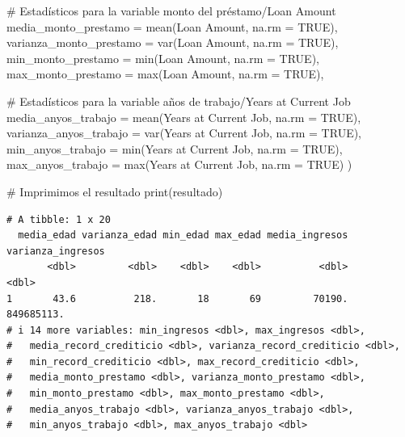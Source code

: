\documentclass[
  letterpaper,
  DIV=11,
  numbers=noendperiod]{scrreprt}
\newenvironment{Shaded}{\begin{snugshade}}{\end{snugshade}}
\newcommand{\AttributeTok}[1]{\textcolor[rgb]{0.40,0.45,0.13}{#1}}
\newcommand{\CommentTok}[1]{\textcolor[rgb]{0.37,0.37,0.37}{#1}}
\newcommand{\ConstantTok}[1]{\textcolor[rgb]{0.56,0.35,0.01}{#1}}
\newcommand{\FunctionTok}[1]{\textcolor[rgb]{0.28,0.35,0.67}{#1}}
\newcommand{\NormalTok}[1]{\textcolor[rgb]{0.00,0.23,0.31}{#1}}
\newcommand{\StringTok}[1]{\textcolor[rgb]{0.13,0.47,0.30}{#1}}
\begin{document}
\begin{Shaded}
\begin{Highlighting}[]
    \CommentTok{\# Estadísticos para la variable monto del préstamo/Loan Amount}
    \AttributeTok{media\_monto\_prestamo =} \FunctionTok{mean}\NormalTok{(}\StringTok{\textasciigrave{}}\AttributeTok{Loan Amount}\StringTok{\textasciigrave{}}\NormalTok{, }\AttributeTok{na.rm =} \ConstantTok{TRUE}\NormalTok{),}
    \AttributeTok{varianza\_monto\_prestamo =} \FunctionTok{var}\NormalTok{(}\StringTok{\textasciigrave{}}\AttributeTok{Loan Amount}\StringTok{\textasciigrave{}}\NormalTok{, }\AttributeTok{na.rm =} \ConstantTok{TRUE}\NormalTok{),}
    \AttributeTok{min\_monto\_prestamo =} \FunctionTok{min}\NormalTok{(}\StringTok{\textasciigrave{}}\AttributeTok{Loan Amount}\StringTok{\textasciigrave{}}\NormalTok{, }\AttributeTok{na.rm =} \ConstantTok{TRUE}\NormalTok{),}
    \AttributeTok{max\_monto\_prestamo =} \FunctionTok{max}\NormalTok{(}\StringTok{\textasciigrave{}}\AttributeTok{Loan Amount}\StringTok{\textasciigrave{}}\NormalTok{, }\AttributeTok{na.rm =} \ConstantTok{TRUE}\NormalTok{),}
    
    \CommentTok{\# Estadísticos para la variable años de trabajo/Years at Current Job}
    \AttributeTok{media\_anyos\_trabajo =} \FunctionTok{mean}\NormalTok{(}\StringTok{\textasciigrave{}}\AttributeTok{Years at Current Job}\StringTok{\textasciigrave{}}\NormalTok{, }\AttributeTok{na.rm =} \ConstantTok{TRUE}\NormalTok{),}
    \AttributeTok{varianza\_anyos\_trabajo =} \FunctionTok{var}\NormalTok{(}\StringTok{\textasciigrave{}}\AttributeTok{Years at Current Job}\StringTok{\textasciigrave{}}\NormalTok{, }\AttributeTok{na.rm =} \ConstantTok{TRUE}\NormalTok{),}
    \AttributeTok{min\_anyos\_trabajo =} \FunctionTok{min}\NormalTok{(}\StringTok{\textasciigrave{}}\AttributeTok{Years at Current Job}\StringTok{\textasciigrave{}}\NormalTok{, }\AttributeTok{na.rm =} \ConstantTok{TRUE}\NormalTok{),}
    \AttributeTok{max\_anyos\_trabajo =} \FunctionTok{max}\NormalTok{(}\StringTok{\textasciigrave{}}\AttributeTok{Years at Current Job}\StringTok{\textasciigrave{}}\NormalTok{, }\AttributeTok{na.rm =} \ConstantTok{TRUE}\NormalTok{)}
\NormalTok{  )}

\CommentTok{\# Imprimimos el resultado}
\FunctionTok{print}\NormalTok{(resultado)}
\end{Highlighting}
\end{Shaded}

\begin{verbatim}
# A tibble: 1 x 20
  media_edad varianza_edad min_edad max_edad media_ingresos varianza_ingresos
       <dbl>         <dbl>    <dbl>    <dbl>          <dbl>             <dbl>
1       43.6          218.       18       69         70190.        849685113.
# i 14 more variables: min_ingresos <dbl>, max_ingresos <dbl>,
#   media_record_crediticio <dbl>, varianza_record_crediticio <dbl>,
#   min_record_crediticio <dbl>, max_record_crediticio <dbl>,
#   media_monto_prestamo <dbl>, varianza_monto_prestamo <dbl>,
#   min_monto_prestamo <dbl>, max_monto_prestamo <dbl>,
#   media_anyos_trabajo <dbl>, varianza_anyos_trabajo <dbl>,
#   min_anyos_trabajo <dbl>, max_anyos_trabajo <dbl>
\end{verbatim}
\end{document}
